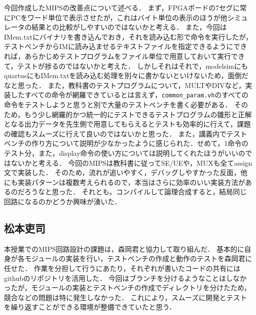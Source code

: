 \documentclass[dvipdfmx]{jsarticle}
\begin{document}
今回作成したMIPSの改善点について述べる．
まず，FPGAボードの7セグに常にPCをワード単位で表示させたが，これはバイト単位の表示のほうが他シミュレータの結果との比較がしやすいのではないかと考える．
また，今回はIMem.txtにバイナリを書き込んでおき，それを読み込む形で命令を実行したが，テストベンチからIMに読み込ませるテキストファイルを指定できるようにできれば，あらかじめテストプログラムをファイル単位で用意しておいて実行できて，テストが捗るのではないかと考えた．
しかしそれはそれで，modelsimにもquartusにもIMem.txtを読み込む処理を別々に書かないといけないため，面倒だなと思った．
また，教科書のテストプログラムについて，MULTやDIVなど，実装したすべての命令が網羅できているとは言えず，\texttt{common\_param.vh}のすべての命令をテストしようと思うと別で大量のテストベンチを書く必要がある．
そのため，もう少し網羅的かつ統一的にテストできるテストプログラムの雛形と正解となる出力データを先生側で用意してもらえるとテストも効率的に行えて，課題の確認もスムーズに行えて良いのではないかと思った．
また，講義内でテストベンチの作り方について説明が少なかったように感じられた．せめて，1命令のテスト分，また，display命令の使い方については説明してくれたほうがいいのではないかと考える．
今回のMIPSは教科書に従ってSE/UEや，MUXも全てassign文で実装した．
そのため，流れが追いやすく，デバッグしやすかった反面，他にも実装パターンは複数考えられるので，本当はさらに効率のいい実装方法があるのだろうなと思った．
それとも，コンパイルして論理合成すると，結局同じ回路になるのかどうか興味が湧いた．

\subsection{松本吏司}
本授業でのMIPS回路設計の課題は，森岡君と協力して取り組んだ．
基本的に自身が各モジュールの実装を行い，テストベンチの作成と動作のテストを森岡君に任せた．
作業を分担して行うにあたり，それぞれが書いたコードの共有にはgithubのリポジトリを活用した．
今回はブランチを分けるようなことはしなかったが，モジュールの実装とテストベンチの作成でディレクトリを分けたため，競合などの問題は特に発生しなかった．
これにより，スムーズに開発とテストを繰り返すことができる環境が整備できていたと思う．
\end{document}
